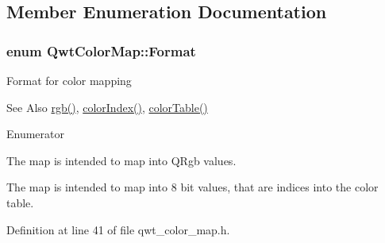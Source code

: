 \subsection{Member Enumeration Documentation}
\hypertarget{class_qwt_color_map_a9e5570790910fa3894887bca7dc5a670}{
\subsubsection[{Format}]{\setlength{\rightskip}{0pt plus 5cm}enum {\bf Qwt\-Color\-Map\-::\-Format}}}\label{class_qwt_color_map_a9e5570790910fa3894887bca7dc5a670}
Format for color mapping \begin{DoxySeeAlso}{See Also}
\hyperlink{class_qwt_color_map_aaed0bb47b6379696c588732348438136}{rgb()}, \hyperlink{class_qwt_color_map_a762baa2edca8773ec09e0c1c5df2cf04}{color\-Index()}, \hyperlink{class_qwt_color_map_a4ccc23356e058783071b06dee437b6d7}{color\-Table()} 
\end{DoxySeeAlso}
\begin{Desc}
\item[Enumerator]\par
\begin{description}
\item[{\em 
\hypertarget{class_qwt_color_map_a9e5570790910fa3894887bca7dc5a670a663473fd836d9a84fe48ae1755de326a}{R\-G\-B}\label{class_qwt_color_map_a9e5570790910fa3894887bca7dc5a670a663473fd836d9a84fe48ae1755de326a}
}]The map is intended to map into Q\-Rgb values. \item[{\em 
\hypertarget{class_qwt_color_map_a9e5570790910fa3894887bca7dc5a670a304cb055c004223ca77f1a4cbbf27ea2}{Indexed}\label{class_qwt_color_map_a9e5570790910fa3894887bca7dc5a670a304cb055c004223ca77f1a4cbbf27ea2}
}]The map is intended to map into 8 bit values, that are indices into the color table. \end{description}
\end{Desc}


Definition at line 41 of file qwt\-\_\-color\-\_\-map.\-h.



